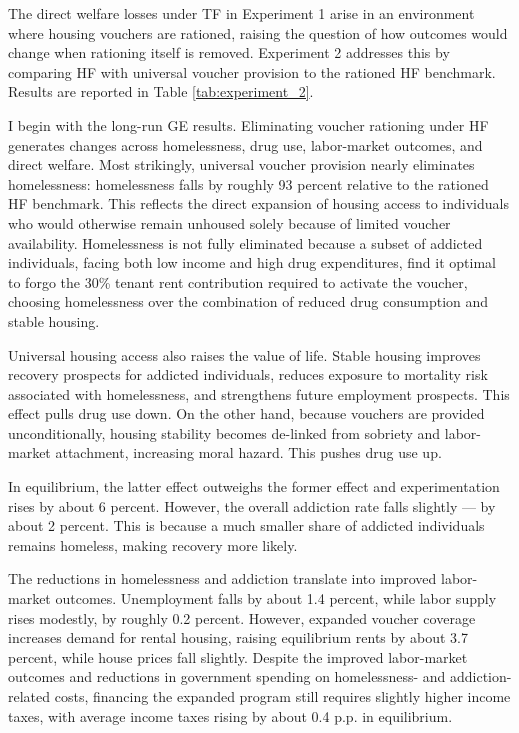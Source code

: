 \documentclass[parskip=full]{article}
\theoremstyle{plain}
\theoremstyle{definition}
\theoremstyle{remark}
\begin{document}
The direct welfare losses under TF in Experiment 1 arise in an environment where housing vouchers are rationed, raising the question of how outcomes would change when rationing itself is removed. Experiment 2 addresses this by comparing HF with universal voucher provision to the rationed HF benchmark. Results are reported in Table \ref{tab:experiment_2}. 

I begin with the long-run GE results. Eliminating voucher rationing under HF generates changes across homelessness, drug use, labor-market outcomes, and direct welfare. Most strikingly, universal voucher provision nearly eliminates homelessness: homelessness falls by roughly 93 percent relative to the rationed HF benchmark. This reflects the direct expansion of housing access to individuals who would otherwise remain unhoused solely because of limited voucher availability. Homelessness is not fully eliminated because a subset 
of addicted individuals, facing both low income and high drug expenditures, find it optimal to forgo the 30\% tenant rent contribution required to activate the voucher, choosing homelessness over the combination of reduced drug consumption and stable housing.

Universal housing access also raises the value of life. Stable housing improves recovery prospects for addicted individuals, reduces exposure to mortality risk associated with homelessness, and strengthens future employment prospects. This effect pulls drug use down. On the other hand, because vouchers are provided unconditionally, housing stability becomes de-linked from sobriety and labor-market attachment, increasing moral hazard. This pushes drug use up. 

In equilibrium, the latter effect outweighs the former effect and experimentation rises by about 6 percent. However, the overall addiction rate falls slightly — by about 2 percent. This is because a much smaller share of addicted individuals remains homeless, making recovery more likely. 

The reductions in homelessness and addiction translate into improved labor-market outcomes. Unemployment falls by about 1.4 percent, while labor supply rises modestly, by roughly 0.2 percent. However, expanded voucher coverage increases demand for rental housing, raising equilibrium rents by about 3.7 percent, while house prices fall slightly. Despite the improved labor-market outcomes and reductions in government spending on homelessness- and addiction-related costs, financing the expanded program still requires slightly higher income taxes, with average income taxes rising by about 0.4 p.p. in equilibrium.
\end{document}
